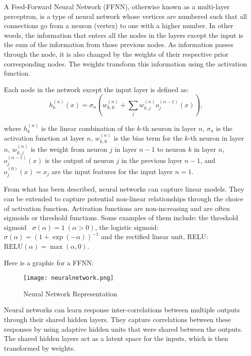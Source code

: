 A Feed-Forward Neural Network (FFNN), otherwise known as a multi-layer perceptron, is a type of neural network whose vertices are numbered such that all connections go from a neuron (vertex) to one with a higher number. In other words, the information that enters all the nodes in the layers except the input is the sum of the information from those previous nodes. As information passes through the node, it is also changed by the weights of their respective prior corresponding nodes. The weights transform this information using the activation function. 

\noindent Each node in the network except the input layer is defined as:
\[
h_k^{(n)}(x) = \sigma_n \left( w_{k,0}^{(n)} + \sum_j w_{k,j}^{(n)} o_j^{(n-1)}(x) \right),
\]

\noindent where \( h_k^{(n)} \) is the linear combination of the \( k \)-th neuron in layer \( n \), \( \sigma_n \) is the activation function at layer \( n \), \( w_{k,0}^{(n)} \) is the bias term for the \( k \)-th neuron in layer \( n \), \( w_{k,j}^{(n)} \) is the weight from neuron \( j \) in layer \( n-1 \) to neuron \( k \) in layer \( n \), \( o_j^{(n-1)}(x) \) is the output of neuron \( j \) in the previous layer \( n-1 \), and \( o_j^{(0)}(x) = x_j \) are the input features for the input layer \( n = 1 \).

From what has been described, neural networks can capture linear models. They can be extended to capture potential non-linear relationships through the choice of activation function. Activation functions are non-increasing and are often sigmoids or threshold functions. Some examples of them include: the threshold sigmoid \ \(\sigma(\alpha) = 1 \ (\alpha > 0)\), the logistic sigmoid: \ \(\sigma(\alpha) = (1 + \exp(-\alpha))^{-1}\) and the rectified linear unit, RELU: \ \(\text{RELU}(\alpha) = \max(\alpha, 0)\).

\noindent Here is a graphic for a FFNN:
\begin{figure}[H]
    \centering
    \texttt{[image: neuralnetwork.png]}
    \caption{Neural Network Representation \cite{rosebrock2016neuralnetwork}}
    \label{fig:neuralnetwork}
\end{figure}

Neural networks can learn response inter-correlations between multiple outputs through their shared hidden layers. They capture correlations between these responses by using adaptive hidden units that were shared between the outputs.\cite{wilson2011gaussian} The shared hidden layers act as a latent space for the inputs, which is then transformed by weights.\cite{menet2023mimonets}

